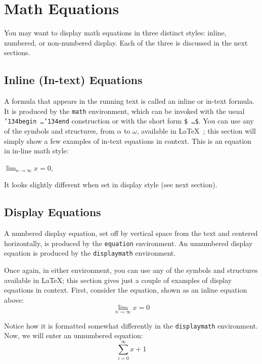 \documentclass[sigconf]{acmart}
\begin{document}
\section{Math Equations}
You may want to display math equations in three distinct styles: inline, numbered, or non-numbered display. Each of the three is discussed in the next sections.

\subsection{Inline (In-text) Equations}
A formula that appears in the running text is called an inline or in-text formula. It is produced by the \texttt{math} environment, which can be invoked with the usual \texttt{{\char'134}begin\,\ldots{\char'134}end} construction or with the short form \texttt{\$\,\ldots\$}. You can use any of the symbols and structures, from $\alpha$ to $\omega$, available in \LaTeX~\cite{Lamport:LaTeX}; this section will simply show a few examples of in-text equations in context. This is an equation in in-line math style:

\begin{math}
  \lim_{n\rightarrow \infty}x=0
\end{math},

It looks slightly different when set in display style (see next section).

\subsection{Display Equations}
A numbered display equation, set off by vertical space from the text and centered horizontally, is produced by the \texttt{equation} environment. An unnumbered display equation is produced by the \texttt{displaymath} environment.

Once again, in either environment, you can use any of the symbols and structures available in \LaTeX\@; this section gives just a couple of examples of display equations in context. First, consider the equation, shown as an inline equation above:
\begin{equation}
  \lim_{n\rightarrow \infty}x=0
\end{equation}

Notice how it is formatted somewhat differently in the \texttt{displaymath} environment. Now, we will enter an unnumbered equation:
\begin{displaymath}
  \sum_{i=0}^{\infty} x + 1
\end{displaymath}
\end{document}
